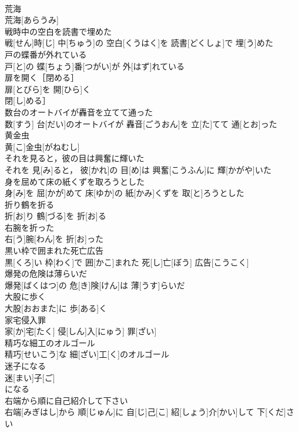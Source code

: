 \documentclass[8pt]{extreport}
\begin{document}
\begin{CJK}{UTF8}{min}
\\	荒海	
\\	荒海[あらうみ]
\\	戦時中の空白を読書で埋めた	
\\	戦[せん]時[じ] 中[ちゅう]の 空白[くうはく]を 読書[どくしょ]で 埋[う]めた
\\	戸の蝶番が外れている	
\\	戸[と]の 蝶[ちょう]番[つがい]が 外[はず]れている
\\	扉を開く［閉める］	
\\	扉[とびら]を 開[ひら]く
\\	閉[し]める］
\\	数台のオートバイが轟音を立てて通った	
\\	数[すう] 台[だい]のオートバイが 轟音[ごうおん]を 立[た]てて 通[とお]った
\\	黄金虫	
\\	黄[こ]金虫[がねむし] 
\\	それを見ると，彼の目は興奮に輝いた	
\\	それを 見[み]ると， 彼[かれ]の 目[め]は 興奮[こうふん]に 輝[かがや]いた
\\	身を屈めて床の紙くずを取ろうとした	
\\	身[み]を 屈[かが]めて 床[ゆか]の 紙[かみ]くずを 取[と]ろうとした
\\	折り鶴を折る	
\\	折[お]り 鶴[づる]を 折[お]る
\\	右腕を折った	
\\	右[う]腕[わん]を 折[お]った
\\	黒い枠で囲まれた死亡広告	
\\	黒[くろ]い 枠[わく]で 囲[かこ]まれた 死[し]亡[ぼう] 広告[こうこく]
\\	爆発の危険は薄らいだ	
\\	爆発[ばくはつ]の 危[き]険[けん]は 薄[うす]らいだ
\\	大股に歩く	
\\	大股[おおまた]に 歩[ある]く
\\	家宅侵入罪	
\\	家[か]宅[たく] 侵[しん]入[にゅう] 罪[ざい]
\\	精巧な細工のオルゴール	
\\	精巧[せいこう]な 細[ざい]工[く]のオルゴール
\\	迷子になる	
\\	迷[まい]子[ご]
\\	になる 
\\	右端から順に自己紹介して下さい	
\\	右端[みぎはし]から 順[じゅん]に 自[じ]己[こ] 紹[しょう]介[かい]して 下[くだ]さい

\end{CJK}
\end{document}
